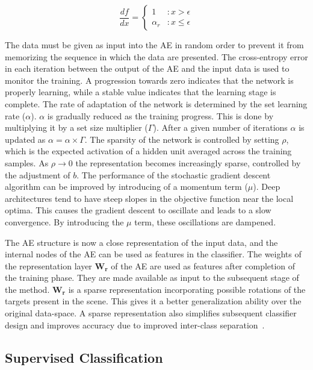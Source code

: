 \begin{displaymath}
   \frac{df}{dx} = \left\{
     \begin{array}{lr}
       1 & : x > \epsilon\\
       \alpha_r & : x \leq \epsilon
     \end{array}
   \right.
\end{displaymath}

The data must be given as input into the AE in random order to prevent it from memorizing the sequence in which the data are presented. The cross-entropy error in each iteration between the output of the AE and the input data is used to monitor the training. A progression towards zero indicates that the network is properly learning, while a stable value indicates that the learning stage is complete. The rate of adaptation of the network is determined by the set learning rate ($\alpha$). $\alpha$ is gradually reduced as the training progress. This is done by multiplying it by a set size multiplier ($\Gamma$). After a given number of iterations $\alpha$ is updated as $\alpha = \alpha \times \Gamma$.  The sparsity of the network is controlled by setting $\rho$, which is the expected activation of a hidden unit averaged across the training samples. As $\rho \rightarrow 0$ the representation becomes increasingly sparse, controlled by the adjustment of $b$. The performance of the stochastic gradient descent algorithm can be improved by introducing of a momentum term ($\mu$). Deep architectures tend to have steep slopes in the objective function near the local optima. This causes the gradient descent to oscillate and leads to a slow convergence. By introducing the $\mu$ term, these oscillations are dampened. 

The AE structure is now a close representation of the input data, and the internal nodes of the AE can be used as features in the classifier. The weights of the representation layer $\bm{W_r}$ of the AE are used as features after completion of the training phase. They are made available as input to the subsequent stage of the method. $\bm{W_r}$ is a sparse representation incorporating possible rotations of the targets present in the scene. This gives it a better generalization ability over the original data-space. A sparse representation also simplifies subsequent classifier design and improves accuracy due to improved inter-class separation~\cite{bengio2009learning}. 

\subsection{Supervised Classification} ~\label{sec:stage3}

